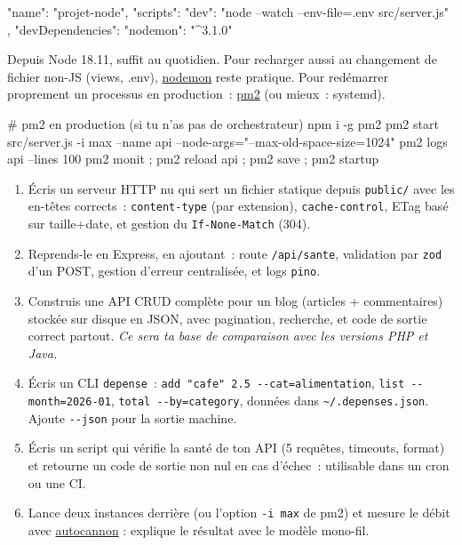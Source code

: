 \documentclass[12pt,a4paper,twoside,openright]{book}
\providecommand{\cmd}[1]{}%
\renewcommand{\cmd}[1]{\srcbox{\texttt{\detokenize{#1}}}}
\newcommand{\link}[2]{\href{#2}{#1}}
\begin{document}
\begin{codejson}
{
  "name": "projet-node",
  "scripts": { "dev": "node --watch --env-file=.env src/server.js" },
  "devDependencies": { "nodemon": "^3.1.0" }
}
\end{codejson}

Depuis Node 18.11, \cmd{node --watch} suffit au quotidien. Pour recharger aussi au changement de
fichier non-JS (views, .env), \link{nodemon}{https://nodemon.io/} reste pratique. Pour red\'emarrer
proprement un processus en production~: \link{pm2}{https://pm2.keymetrics.io/} (ou mieux~: systemd).

\begin{terminal}
# pm2 en production (si tu n'as pas de orchestrateur)
npm i -g pm2
pm2 start src/server.js -i max --name api --node-args="--max-old-space-size=1024"
pm2 logs api --lines 100
pm2 monit ; pm2 reload api ; pm2 save ; pm2 startup
\end{terminal}

\begin{exercice}
\begin{enumerate}
  \item \'Ecris un serveur HTTP nu qui sert un fichier statique depuis \verb|public/| avec les
        en-t\^etes corrects~: \verb|content-type| (par extension), \verb|cache-control|, ETag
        bas\'e sur taille+date, et gestion du \verb|If-None-Match| (304).
  \item Reprends-le en Express, en ajoutant~: route \verb|/api/sante|, validation par
        \verb|zod| d'un POST, gestion d'erreur centralis\'ee, et logs \verb|pino|.
  \item Construis une API CRUD compl\`ete pour un blog (articles + commentaires) stock\'ee sur
        disque en JSON, avec pagination, recherche, et code de sortie correct partout.
        \emph{Ce sera ta base de comparaison avec les versions PHP et Java.}
  \item \'Ecris un CLI \verb|depense|~: \verb|add "cafe" 2.5 --cat=alimentation|,
        \verb|list --month=2026-01|, \verb|total --by=category|, donn\'ees dans
        \verb|~/.depenses.json|. Ajoute \verb|--json| pour la sortie machine.
  \item \'Ecris un script qui v\'erifie la sant\'e de ton API (5 requ\^etes, timeouts, format) et
        retourne un code de sortie non nul en cas d'\'echec~: utilisable dans un cron ou une CI.
  \item Lance deux instances derri\`ere \cmd{node --cluster} (ou l'option \verb|-i max| de pm2)
        et mesure le d\'ebit avec \link{autocannon}{https://github.com/mcollina/autocannon} :
        explique le r\'esultat avec le mod\`ele mono-fil.
\end{enumerate}
\end{exercice}
\end{document}
